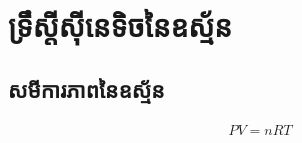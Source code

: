 \chapter{ទ្រឹស្តីស៊ីនេទិចនៃឧស្ម័ន}
\section{សមីការភាពនៃឧស្ម័ន}
\begin{align*}
	PV=nRT
\end{align*}

